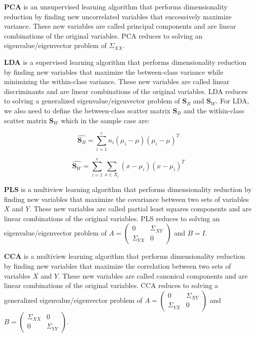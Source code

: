 \textbf{PCA} is an unsupervised learning algorithm that performs dimensionality reduction by finding new uncorrelated variables that successively maximize variance. These new variables are called principal components and are linear combinations of the original variables. PCA reduces to solving an eigenvalue/eigenvector problem of $\Sigma_{XX}$.

\textbf{LDA} is a supervised learning algorithm that performs dimensionality reduction by finding new variables that maximize the between-class variance while minimizing the within-class variance. These new variables are called linear discriminants and are linear combinations of the original variables. LDA reduces to solving a generalized eigenvalue/eigenvector problem of $\mathbf{S}_B$ and $\mathbf{S}_W$. For LDA, we also need to define the between-class scatter matrix $\mathbf{S}_B$ and the within-class scatter matrix $\mathbf{S}_W$ which in the sample case are:

$$
    \hat{\mathbf{S}_B} = \sum_{i=1}^{c} n_i (\mu_i - \mu)(\mu_i - \mu)^T
$$

$$
    \hat{\mathbf{S}_W} = \sum_{i=1}^{c} \sum_{x \in X_i} (x - \mu_i)(x - \mu_i)^T
$$

\textbf{PLS} is a multiview learning algorithm that performs dimensionality reduction by finding new variables that maximize the covariance between two sets of variables $X$ and $Y$. These new variables are called partial least squares components and are linear combinations of the original variables. PLS reduces to solving an eigenvalue/eigenvector problem of $A=\begin{pmatrix} 0 & \Sigma_{XY} \\ \Sigma_{YX} & 0 \end{pmatrix}$ and $B=I$.

\textbf{CCA} is a multiview learning algorithm that performs dimensionality reduction by finding new variables that maximize the correlation between two sets of variables $X$ and $Y$. These new variables are called canonical components and are linear combinations of the original variables. CCA reduces to solving a generalized eigenvalue/eigenvector problem of $A=\begin{pmatrix} 0 & \Sigma_{XY} \\ \Sigma_{YX} & 0\end{pmatrix}$ and $B=\begin{pmatrix} \Sigma_{XX} & 0 \\ 0 & \Sigma_{YY} \end{pmatrix}$.


